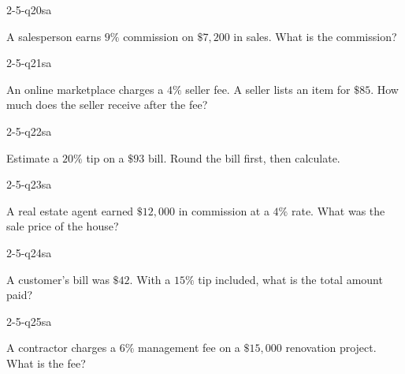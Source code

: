 \begin{practiceQuestion}{2-5-q20}{sa}
\begin{questionText}
A salesperson earns $9\%$ commission on $\$7{,}200$ in sales. What is the commission?
\end{questionText}
\end{practiceQuestion}

\begin{practiceQuestion}{2-5-q21}{sa}
\begin{questionText}
An online marketplace charges a $4\%$ seller fee. A seller lists an item for $\$85$. How much does the seller receive after the fee?
\end{questionText}
\end{practiceQuestion}

\begin{practiceQuestion}{2-5-q22}{sa}
\begin{questionText}
Estimate a $20\%$ tip on a $\$93$ bill. Round the bill first, then calculate.
\end{questionText}
\end{practiceQuestion}

\begin{practiceQuestion}{2-5-q23}{sa}
\begin{questionText}
A real estate agent earned $\$12{,}000$ in commission at a $4\%$ rate. What was the sale price of the house?
\end{questionText}
\end{practiceQuestion}

\begin{practiceQuestion}{2-5-q24}{sa}
\begin{questionText}
A customer's bill was $\$42$. With a $15\%$ tip included, what is the total amount paid?
\end{questionText}
\end{practiceQuestion}

\begin{practiceQuestion}{2-5-q25}{sa}
\begin{questionText}
A contractor charges a $6\%$ management fee on a $\$15{,}000$ renovation project. What is the fee?
\end{questionText}
\end{practiceQuestion}

